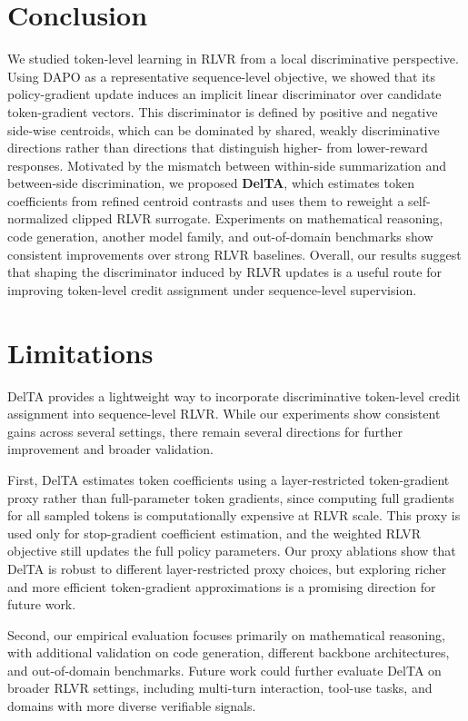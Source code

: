 \documentclass{llmxive}
\begin{document}
\section{Conclusion}
We studied token-level learning in RLVR from a local discriminative perspective.
Using DAPO as a representative sequence-level objective, we showed that its policy-gradient update induces an implicit linear discriminator over candidate token-gradient vectors.
This discriminator is defined by positive and negative side-wise centroids, which can be dominated by shared, weakly discriminative directions rather than directions that distinguish higher- from lower-reward responses.
Motivated by the mismatch between within-side summarization and between-side discrimination, we proposed \textbf{DelTA}, which estimates token coefficients from refined centroid contrasts and uses them to reweight a self-normalized clipped RLVR surrogate.
Experiments on mathematical reasoning, code generation, another model family, and out-of-domain benchmarks show consistent improvements over strong RLVR baselines.
Overall, our results suggest that shaping the discriminator induced by RLVR updates is a useful route for improving token-level credit assignment under sequence-level supervision.





\appendix
\section{Limitations}
DelTA provides a lightweight way to incorporate discriminative token-level credit assignment into sequence-level RLVR. 
While our experiments show consistent gains across several settings, there remain several directions for further improvement and broader validation.

First, DelTA estimates token coefficients using a layer-restricted token-gradient proxy rather than full-parameter token gradients, since computing full gradients for all sampled tokens is computationally expensive at RLVR scale. 
This proxy is used only for stop-gradient coefficient estimation, and the weighted RLVR objective still updates the full policy parameters. 
Our proxy ablations show that DelTA is robust to different layer-restricted proxy choices, but exploring richer and more efficient token-gradient approximations is a promising direction for future work.

Second, our empirical evaluation focuses primarily on mathematical reasoning, with additional validation on code generation, different backbone architectures, and out-of-domain benchmarks. 
Future work could further evaluate DelTA on broader RLVR settings, including multi-turn interaction, tool-use tasks, and domains with more diverse verifiable signals. 
\end{document}
